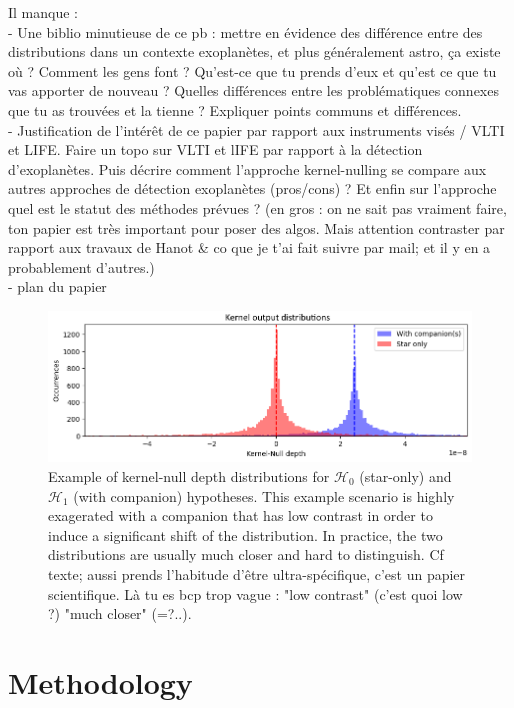 \documentclass{article}
\newcommand{\dm}[1]{{\color{mulberry} #1}}
\begin{document}
\dm{Il manque :\\
- Une biblio minutieuse de ce pb : mettre en évidence des différence entre des distributions dans un contexte exoplanètes, et plus généralement astro, ça existe où ? Comment les gens font ? Qu'est-ce que tu prends d'eux et qu'est ce que tu vas apporter de nouveau ? Quelles différences entre les problématiques connexes que tu as trouvées et la tienne ? Expliquer points communs et différences.\\
- Justification de l'intérêt de ce papier par rapport aux instruments visés / VLTI et LIFE. Faire un topo sur VLTI et lIFE par rapport à la détection d'exoplanètes. Puis décrire comment l'approche kernel-nulling se compare aux autres approches de détection exoplanètes (pros/cons) ? Et enfin sur l'approche quel est le statut des méthodes prévues ? (en gros : on ne sait pas vraiment faire, ton papier est très important pour poser des algos. Mais attention contraster par rapport aux travaux de Hanot \& co que je t'ai fait suivre par mail; et il y en a probablement d'autres.)\\ 
- plan du papier}

\begin{figure}[H]
\centering
\includegraphics[width=\linewidth]{img/output_distribution.png}
\caption{Example of kernel-null depth distributions for $\mathcal{H}_0$ (star-only) and $\mathcal{H}_1$ (with companion) hypotheses. This example scenario is highly exagerated with a companion that has low contrast in order to induce a significant shift of the distribution. In practice, the two distributions are usually much closer and hard to distinguish.\dm{Cf texte; aussi prends l'habitude d'être ultra-spécifique, c'est un papier scientifique. Là tu es bcp trop vague : "low contrast" (c'est quoi low ?) "much closer" (=?..)}.}
\label{fig:distribution}
\end{figure}


\section{Methodology}
\end{document}
